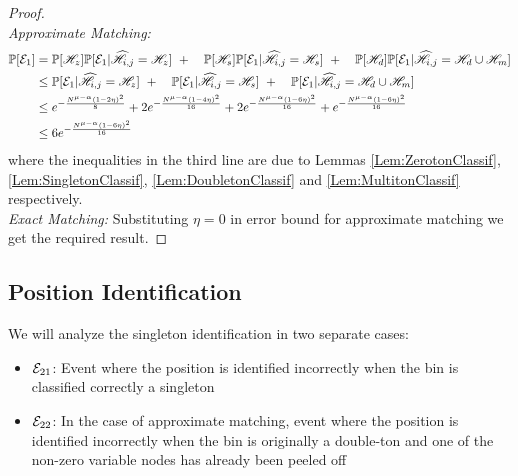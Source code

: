 \begin{proof}
	
\textit{\\Approximate Matching:}	
\begin{align*}
\mathbb{P}[\mathcal{E}_1]&=\mathbb{P}[\mathscr{H}_z]\mathbb{P}[\mathcal{E}_1|\widehat{\mathscr{H}}_{i,j}=\mathscr{H}_z]~+
						\quad \mathbb{P}[\mathscr{H}_s]\mathbb{P}[\mathcal{E}_1|\widehat{\mathscr{H}}_{i,j}=\mathscr{H}_s]~+
						\quad\mathbb{P}[\mathscr{H}_d]\mathbb{P}[\mathcal{E}_1|\widehat{\mathscr{H}}_{i,j}=\mathscr{H}_d \cup \mathscr{H}_m]\\
				&\leq \mathbb{P}[\mathcal{E}_1|\widehat{\mathscr{H}}_{i,j}=\mathscr{H}_z]~+
						\quad \mathbb{P}[\mathcal{E}_1|\widehat{\mathscr{H}}_{i,j}=\mathscr{H}_s]~+
						\quad \mathbb{P}[\mathcal{E}_1|\widehat{\mathscr{H}}_{i,j}=\mathscr{H}_d \cup \mathscr{H}_m]\\
    			&\leq  e^{-\frac{N^{\mu-\alpha}(1-2\eta)^2}{8}}+2e^{-\frac{N^{\mu-\alpha}(1-4\eta)^2}{16}}+ 2e^{-\frac{N^{\mu-\alpha}(1-6\eta)^2}{16}}+e^{-\frac{N^{\mu-\alpha}(1-6\eta)^2}{16}}\\
    			&\leq 6e^{-\frac{N^{\mu-\alpha}(1-6\eta)^2}{16}}\\
						\end{align*}
						where the inequalities in the third line are due to Lemmas \ref{Lem:ZerotonClassif}, \ref{Lem:SingletonClassif}, \ref{Lem:DoubletonClassif} and \ref{Lem:MultitonClassif} respectively.\\

\textit{Exact Matching:} Substituting $\eta = 0$ in error bound for approximate matching we get the required result.						
						
\end{proof}

\subsection{\bf Position Identification}
We will analyze the singleton identification in two separate cases:
\begin{itemize}
\item $\mathcal{E}_{21}$: Event where the position is identified incorrectly when the bin is classified  correctly a singleton
\item $\mathcal{E}_{22}$: In the case of approximate matching, event where the position is identified incorrectly when the bin is originally a double-ton and one of the non-zero variable nodes has already been peeled off
\end{itemize}

